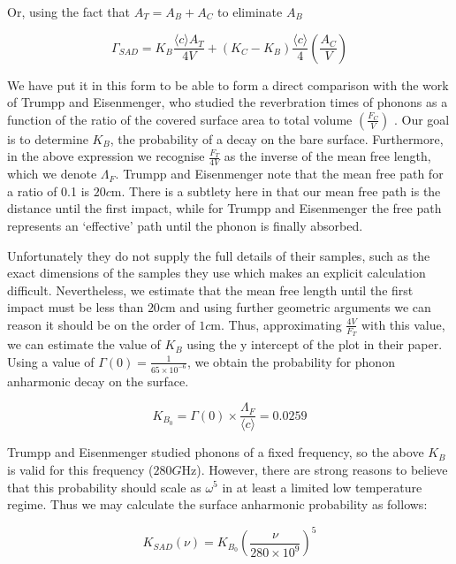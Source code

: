 \documentclass[11pt]{article}
\begin{document}
 Or, using the fact that $A_T = A_B + A_C$ to eliminate $A_B$
 
 \begin{equation}
 \Gamma_{SAD} = K_B \frac{\langle c \rangle A_T}{4V} + (K_C - K_B)\frac{\langle c \rangle}{4} \left(\frac{A_C}{V}\right)
 \end{equation}
 
 We have put it in this form to be able to form a direct comparison with the work of Trumpp and Eisenmenger, who studied the reverbration 
 times of phonons as a function of the ratio of the covered surface area to total volume $\left(\frac{F_C}{V}\right)$ \cite{4}. Our goal is to determine
 $K_B$, the probability of a decay on the bare surface. Furthermore, in the 
 above expression we recognise $\frac{F_T}{4V}$ as the inverse of the mean free length, which we denote $\Lambda_F$.  Trumpp and Eisenmenger 
 note that the mean free path for a ratio of 0.1 is $20\si{c\meter}$. There is a subtlety here in that our mean free path is the distance until 
 the first impact, while for Trumpp and Eisenmenger the free path represents an `effective' path until the phonon is finally absorbed. 
 
 Unfortunately they do not supply the full details of their samples, such as the exact dimensions of the samples they use which makes an 
 explicit calculation difficult. Nevertheless, we estimate that the mean free length until the first impact must be less than $20\si{c\meter}$ and
 using further geometric arguments we can reason it should be on the order of $1 \si{c\meter}$. Thus, approximating $\frac{4V}{F_T}$ with this
 value, we can estimate the value of $K_B$ using the y intercept of the plot in their paper. Using a value of $\Gamma(0) = \frac{1}{65 \times 10^{-6}}$, we obtain the probability for phonon anharmonic decay on the surface.
 
 \begin{equation}
 K_{B_0} = \Gamma(0) \times \frac{\Lambda_F}{\langle c \rangle} = 0.0259
\end{equation}  
 
Trumpp and Eisenmenger studied phonons of a fixed frequency, so the above $K_B$ is valid for this frequency ($280\si{G\hertz}$). However,
there are strong reasons to believe that this probability should scale as $\omega^5$ in at least a limited low temperature regime. Thus we 
may calculate the surface anharmonic probability as follows:

\begin{equation}
K_{SAD}(\nu) = K_{B_0} \left(\frac{\nu}{280 \times 10^{9}}\right)^5
\end{equation}
 
\end{document}
